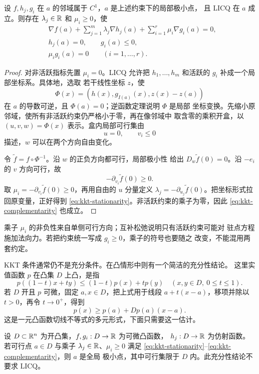 \begin{theorem}
\label{thm:kkt-necessary-licq}
设 $f,h_j,g_i$ 在 $a$ 的邻域属于 $C^1$，$a$ 是上述约束下的局部极小点，
且 LICQ 在 $a$ 成立。则存在 $\lambda_j\in\mathbb{R}$ 和 $\mu_i\ge0$，使
\begin{align}
 &\nabla f(a)+\sum_{j=1}^m\lambda_j\nabla h_j(a)
   +\sum_{i=1}^r\mu_i\nabla g_i(a)=0,
 \label{eq:kkt-stationarity}\\
 &h_j(a)=0,\qquad g_i(a)\le0,
 \label{eq:kkt-primal}\\
 &\mu_i g_i(a)=0\qquad(i=1,\ldots,r).
 \label{eq:kkt-complementarity}
\end{align}
\end{theorem}

\begin{proof}
对非活跃指标先置 $\mu_i=0$。LICQ 允许把
$h_1,\ldots,h_m$ 和活跃的 $g_i$ 补成一个局部坐标系。具体地，选取
若干线性坐标 $z$，使
\[
 \Phi(x)=(h(x),g_{I(a)}(x),z(x)-z(a))
\]
在 $a$ 的导数可逆，且 \(\Phi(a)=0\)；逆函数定理说明 $\Phi$ 是局部
坐标变换。先缩小原邻域，使所有非活跃约束仍严格小于零，再在像邻域中
取含零的乘积开盒，以 $(u,v,w)=\Phi(x)$ 表示。盒内局部可行集由
\[
 u=0,\qquad v_i\le0
\]
描述，$w$ 可以在两个方向自由变化。

令 $\widetilde f=f\circ\Phi^{-1}$。沿 $w$ 的正负方向都可行，局部极小性
给出 $D_w\widetilde f(0)=0$。沿 $-e_i$ 的 $v$ 方向可行，故
\[
 -\partial_{v_i}\widetilde f(0)\ge0.
\]
取 $\mu_i=-\partial_{v_i}\widetilde f(0)\ge0$，再用自由的 $u$ 分量定义
$\lambda_j=-\partial_{u_j}\widetilde f(0)$。把坐标形式拉回原变量，正好得到
\eqref{eq:kkt-stationarity}。非活跃约束的乘子为零，因此
\eqref{eq:kkt-complementarity} 也成立。
\end{proof}

乘子 $\mu_i$ 的非负性来自单侧可行方向；互补松弛说明只有活跃约束可能对
驻点方程施加法向力。若把约束统一写成 $g_i\ge0$，乘子的符号也要随之
改变，不能混用两套约定。

KKT 条件通常仍不是充分条件。在凸情形中则有一个简洁的充分性结论。
这里实值函数 \(p\) 在凸集 \(D\) 上凸，是指
\[
 p((1-t)x+ty)\le(1-t)p(x)+tp(y)
 \quad(x,y\in D,\ 0\le t\le1).
\]
若 \(D\) 开且 \(p\) 可微，固定 \(a,x\in D\)，把上式用于线段
\(a+t(x-a)\)，移项并除以 \(t>0\)，再令 \(t\to0^+\)，得到
\[
 p(x)\ge p(a)+Dp(a)(x-a).
\]
这是一元凸函数切线不等式的多元形式，下面只需要这一估计。

\begin{theorem}[凸问题中的充分性]
\label{thm:kkt-sufficient-convex}
设 \(D\subset\mathbb{R}^n\) 为开凸集，$f,g_i:D\to\mathbb{R}$ 为可微凸函数，
$h_j:D\to\mathbb{R}$ 为仿射函数。若可行点 $a\in D$ 与乘子
$\lambda_j\in\mathbb{R}$、$\mu_i\ge0$ 满足
\eqref{eq:kkt-stationarity}--\eqref{eq:kkt-complementarity}，则 $a$ 是全局
极小点，其中可行集限于 \(D\) 内。此充分性结论不要求 LICQ。
\end{theorem}

